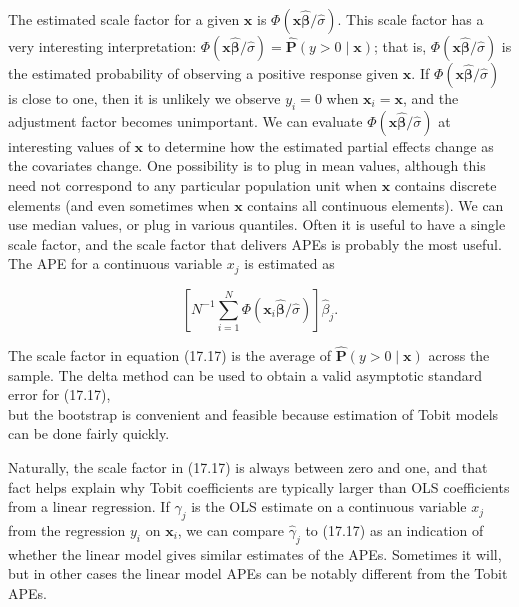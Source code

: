 \documentclass[10pt]{article}
\begin{document}
The estimated scale factor for a given $\mathbf{x}$ is $\Phi(\mathbf{x} \hat{\boldsymbol{\beta}} / \hat{\sigma})$. This scale factor has a very interesting interpretation: $\Phi(\mathbf{x} \hat{\boldsymbol{\beta}} / \hat{\sigma})=\hat{\mathbf{P}}(y>0 \mid \mathbf{x})$; that is, $\Phi(\mathbf{x} \hat{\boldsymbol{\beta}} / \hat{\sigma})$ is the estimated probability of observing a positive response given $\mathbf{x}$. If $\Phi(\mathbf{x} \hat{\boldsymbol{\beta}} / \hat{\sigma})$ is close to one, then it is unlikely we observe $y_{i}=0$ when $\mathbf{x}_{i}=\mathbf{x}$, and the adjustment factor becomes unimportant. We can evaluate $\Phi(\mathbf{x} \hat{\boldsymbol{\beta}} / \hat{\sigma})$ at interesting values of $\mathbf{x}$ to determine how the estimated partial effects change as the covariates change. One possibility is to plug in mean values, although this need not correspond to any particular population unit when $\mathbf{x}$ contains discrete elements (and even sometimes when $\mathbf{x}$ contains all continuous elements). We can use median values, or plug in various quantiles. Often it is useful to have a single scale factor, and the scale factor that delivers APEs is probably the most useful. The APE for a continuous variable $x_{j}$ is estimated as


\begin{equation*}
\left[N^{-1} \sum_{i=1}^{N} \Phi\left(\mathbf{x}_{i} \hat{\boldsymbol{\beta}} / \hat{\sigma}\right)\right] \hat{\beta}_{j} . \tag{17.17}
\end{equation*}


The scale factor in equation (17.17) is the average of $\hat{\mathbf{P}}(y>0 \mid \mathbf{x})$ across the sample. The delta method can be used to obtain a valid asymptotic standard error for (17.17),\\
but the bootstrap is convenient and feasible because estimation of Tobit models can be done fairly quickly.

Naturally, the scale factor in (17.17) is always between zero and one, and that fact helps explain why Tobit coefficients are typically larger than OLS coefficients from a linear regression. If $\hat{\gamma}_{j}$ is the OLS estimate on a continuous variable $x_{j}$ from the regression $y_{i}$ on $\mathbf{x}_{i}$, we can compare $\hat{\gamma}_{j}$ to (17.17) as an indication of whether the linear model gives similar estimates of the APEs. Sometimes it will, but in other cases the linear model APEs can be notably different from the Tobit APEs.
\end{document}
